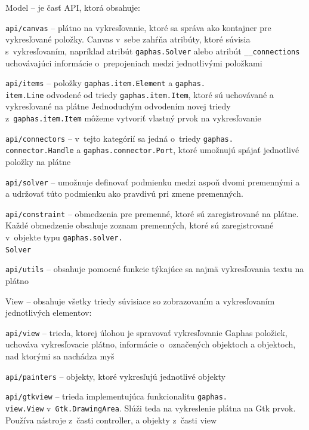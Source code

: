 \documentclass[11pt,oneside,final]{fithesis2}
\begin{document}
\begin{list}{•}{}

\item Model -- je časť API, ktorá obsahuje:

    \begin{list}{•}{}
    	\item \texttt{api/canvas} -- plátno na vykresľovanie, ktoré sa správa ako kontajner pre vykresľované položky. Canvas v~sebe zahŕňa atribúty, ktoré súvisia s~vykresľovaním, napríklad atribút \texttt{gaphas.Solver} alebo atribút \texttt{\_\_connections} uchovávajúci informácie o~prepojeniach medzi jednotlivými položkami
    	\item \texttt{api/items} -- položky \texttt{gaphas.item.Element} a \texttt{gaphas.\\item.Line} odvodené od triedy \texttt{gaphas.item.Item}, ktoré sú uchovávané a vykresľované na plátne
    	Jednoduchým odvodením novej triedy z~\texttt{gaphas.item.Item} môžeme vytvoriť vlastný prvok na vykresľovanie
    	\item \texttt{api/connectors} -- v~tejto kategórií sa jedná o~triedy \texttt{gaphas.\\connector.Handle} a \texttt{gaphas.connector.Port}, ktoré umožnujú spájať jednotlivé položky na plátne
    	\item \texttt{api/solver} -- umožnuje definovať podmienku medzi aspoň dvomi premennými a a udržovať túto podmienku ako pravdivú pri zmene premenných.
 		\item \texttt{api/constraint} -- obmedzenia pre premenné, ktoré sú zaregistrované na plátne. Každé obmedzenie obsahuje zoznam premenných, ktoré sú zaregistrované v~objekte typu \texttt{gaphas.solver.\\Solver}
 		\item \texttt{api/utils} -- obsahuje pomocné funkcie týkajúce sa najmä vykresľovania textu na plátno
    \end{list}


\item View -- obsahuje všetky triedy súvisiace so zobrazovaním a vykresľovaním jednotlivých elementov:
    \begin{list}{•}{}
    \item \texttt{api/view} -- trieda, ktorej úlohou je spravovať vykresľovanie Gaphas položiek, uchováva vykresľovacie plátno, informácie o~označených objektoch a objektoch, nad ktorými sa nachádza myš
    \item \texttt{api/painters} -- objekty, ktoré vykresľujú jednotlivé objekty
    \item \texttt{api/gtkview} -- trieda implementujúca funkcionalitu \texttt{gaphas.\\view.View} v~\texttt{Gtk.DrawingArea}. Slúži teda na vykreslenie plátna na Gtk prvok. Používa nástroje z~časti controller, a objekty z~časti view
    \end{list}



\end{list}
\end{document}
